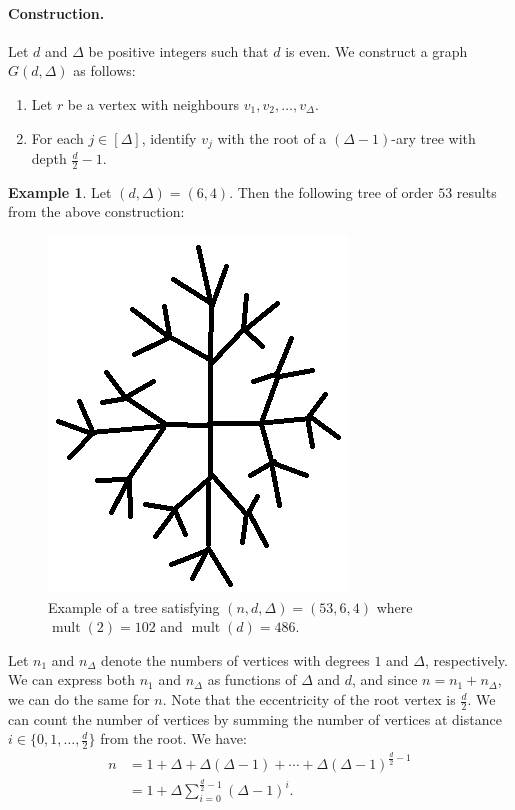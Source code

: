 \documentclass[12]{article}
\DeclareMathOperator{\mult}{mult}
\theoremstyle{definition}
\newtheorem{eg}{Example}
\begin{document}
	\paragraph{Construction.} Let $d$ and $\Delta$ be positive integers such that $d$ is even.  We construct a graph $G(d,\Delta)$ as follows:
	\begin{enumerate}
		\item Let $r$ be a vertex with neighbours $v_{1},v_{2}, \ldots, v_{\Delta}$.
		
		\item For each $j \in [\Delta]$, identify $v_{j}$ with the root of a $(\Delta-1)$-ary tree with depth $\tfrac{d}{2}-1$.
	\end{enumerate}
	
	\begin{eg}
		Let $(d,\Delta) = (6,4)$.  Then the following tree of order $53$ results from the above construction:
		\begin{figure}[h]
			\begin{center}
				\includegraphics[scale = 0.5]{Delta-ary-tree-example.png}
			\end{center}
			\caption{Example of a tree satisfying $(n,d,\Delta) = (53,6,4)$ where $\mult(2) = 102$ and $\mult(d) = 486$.}
		\end{figure}
	\end{eg}
	
	Let $n_1$ and $n_\Delta$ denote the numbers of vertices with degrees $1$ and $\Delta$, respectively.  We can express both $n_1$ and $n_\Delta$ as functions of $\Delta$ and $d$, and since $n = n_1 + n_\Delta$, we can do the same for $n$.  Note that the eccentricity of the root vertex is $\tfrac{d}{2}$.  We can count the number of vertices by summing the number of vertices at distance $i \in \{0,1, \ldots, \tfrac{d}{2}\}$ from the root.  We have:
	\begin{align*}
		n &= 1 + \Delta + \Delta(\Delta-1) + \cdots + \Delta(\Delta-1)^{\tfrac{d}{2}-1}	\\
		&= 1 + \Delta\sum_{i=0}^{\tfrac{d}{2}-1}(\Delta - 1)^i.
	\end{align*}
\end{document}
